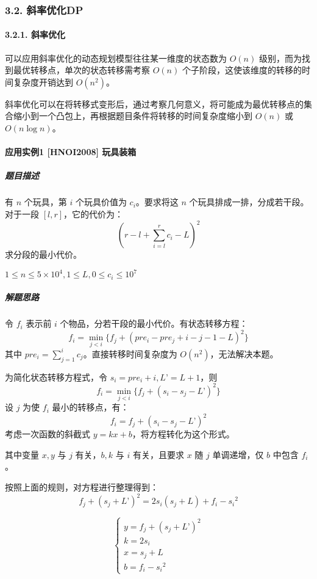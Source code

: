 \subsubsection{3.2. 斜率优化DP}

\paragraph{3.2.1. 斜率优化}

可以应用斜率优化的动态规划模型往往某一维度的状态数为 \(O(n)\)
级别，而为找到最优转移点，单次的状态转移需考察 \(O(n)\)
个子阶段，这使该维度的转移的时间复杂度开销达到 \(O(n^2)\)。

斜率优化可以在将转移式变形后，通过考察几何意义，将可能成为最优转移点的集合缩小到一个凸包上，再根据题目条件将转移的时间复杂度缩小到
\(O(n)\) 或 \(O(n\log n)\)。

\paragraph{应用实例1 {[}HNOI2008{]} 玩具装箱}

\subparagraph{题目描述}

有 \(n\) 个玩具，第 \(i\) 个玩具价值为 \(c_i\)。要求将这 \(n\)
个玩具排成一排，分成若干段。对于一段 \([l,r]\)，它的代价为： \[
(r-l+\sum_{i=l}^r c_i-L)^2
\] 求分段的最小代价。

\(1\le n\le 5\times 10^4,1\le L,0\le c_i\le 10^7\)

\subparagraph{解题思路}

令 \(f_i\) 表示前 \(i\) 个物品，分若干段的最小代价。有状态转移方程： \[
f_i=\min_{j<i}{\{f_j+(pre_i-pre_j+i-j-1-L)^2\}}
\] 其中 \(pre_i = \sum_{j=1}^i c_j\)。直接转移时间复杂度为
\(O (n^2)\)，无法解决本题。

为简化状态转移方程式，令 \(s_i=pre_i+i,L’=L+1\)，则 \[
f_i=\min_{j<i}\{f_j+(s_i-s_j-L’)^2\}
\] 设 \(j\) 为使 \(f_i\) 最小的转移点，有： \[
f_i=f_j+(s_i-s_j-L’)^2
\] 考虑一次函数的斜截式 \(y=kx+b\)，将方程转化为这个形式。

其中变量 \(x, y\) 与 \(j\) 有关，\(b, k\) 与 \(i\) 有关，且要求 \(x\) 随
\(j\) 单调递增，仅 \(b\) 中包含 \(f_i\)。

按照上面的规则，对方程进行整理得到： \[
f_j+(s_j+L’)^2=2s_i(s_j+L)+f_i-{s_i}^2
\]

\[
\left\{
\begin{array}{lr}
y = f_j+(s_j+L’)^2\\
k = 2s_i\\
x = s_j+L\\
b = f_i-{s_i}^2
\end{array}
\right.
\]

